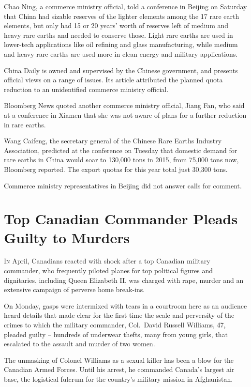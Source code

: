 ﻿\documentclass[12pt]{article}
\begin{document}
Chao Ning, a commerce ministry official, told a conference in Beijing on Saturday that China had
sizable reserves of the lighter elements among the 17 rare earth elements, but only had 15 or 20
years' worth of reserves left of medium and heavy rare earths and needed to conserve those. Light
rare earths are used in lower-tech applications like oil refining and glass manufacturing, while
medium and heavy rare earths are used more in clean energy and military applications.

China Daily is owned and supervised by the Chinese government, and presents official views on a
range of issues. Its article attributed the planned quota reduction to an unidentified commerce
ministry official.

Bloomberg News quoted another commerce ministry official, Jiang Fan, who said at a conference in
Xiamen that she was not aware of plans for a further reduction in rare earths.

Wang Caifeng, the secretary general of the Chinese Rare Earths Industry Association, predicted at
the conference on Tuesday that domestic demand for rare earths in China would soar to 130,000 tons
in 2015, from 75,000 tons now, Bloomberg reported. The export quotas for this year total just 30,300
tons.

Commerce ministry representatives in Beijing did not answer calls for comment.

\section{Top Canadian Commander Pleads Guilty to Murders}

\lettrine{I}{n} April, Canadians reacted with shock after a top Canadian
military commander, who frequently piloted planes for top political figures and dignitaries,
including Queen Elizabeth II, was charged with rape, murder and an extensive campaign of perverse
home break-ins.

On Monday, gasps were intermixed with tears in a courtroom here as an audience heard details that
made clear for the first time the scale and perversity of the crimes to which the military
commander, Col.~David Russell Williams, 47, pleaded guilty -- hundreds of underwear thefts, many
from young girls, that escalated to the assault and murder of two women.

The unmasking of Colonel Williams as a sexual killer has been a blow for the Canadian Armed Forces.
Until his arrest, he commanded Canada's largest air base, the logistical fulcrum for the country's
military mission in Afghanistan.
\end{document}
